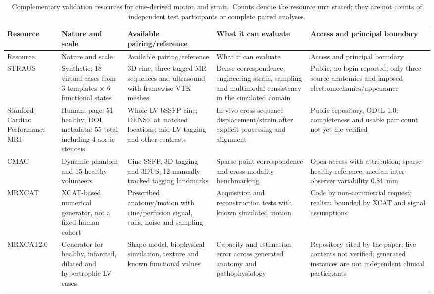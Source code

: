 \Needspace{100mm}
{\scriptsize\sloppy
\setlength{\tabcolsep}{2pt}
\begin{longtable}{L{0.12\textwidth}L{0.14\textwidth}L{0.18\textwidth}L{0.16\textwidth}L{0.20\textwidth}}
\caption{Complementary validation resources for cine-derived motion and strain. Counts denote the resource unit stated; they are not counts of independent test participants or complete paired analyses.}\label{tab:resources}\\
\toprule
Resource & Nature and scale & Available pairing/reference & What it can evaluate & Access and principal boundary \\
\midrule
\endfirsthead
\toprule
Resource & Nature and scale & Available pairing/reference & What it can evaluate & Access and principal boundary \\
\midrule
\endhead
STRAUS~\cite{zhou2018straus,strausdata} & Synthetic; 18 virtual cases from 3 templates $\times$ 6 functional states & 3D cine, three tagged MR sequences and ultrasound with framewise VTK meshes & Dense correspondence, engineering strain, sampling and multimodal consistency in the simulated domain & Public, no login reported; only three source anatomies and imposed electromechanics/appearance \\
\addlinespace
Stanford Cardiac Performance MRI~\cite{stanforddata} & Human; page: 51 healthy; DOI metadata: 55 total including 4 aortic stenosis & Whole-LV bSSFP cine; DENSE at matched locations; mid-LV tagging and other contrasts & In-vivo cross-sequence displacement/strain after explicit processing and alignment & Public repository, ODbL 1.0; completeness and usable pair count not yet file-verified \\
\addlinespace
CMAC~\cite{tobongomez2013cmac,cmac2011} & Dynamic phantom and 15 healthy volunteers & Cine SSFP, 3D tagging and 3DUS; 12 manually tracked tagging landmarks & Sparse point correspondence and cross-modality benchmarking & Open access with attribution; sparse healthy reference, median inter-observer variability 0.84~mm \\
\addlinespace
MRXCAT~\cite{wissmann2014mrxcat} & XCAT-based numerical generator, not a fixed human cohort & Prescribed anatomy/motion with cine/perfusion signal, coils, noise and sampling & Acquisition and reconstruction tests with known simulated motion & Code by non-commercial request; realism bounded by XCAT and signal assumptions \\
\addlinespace
MRXCAT2.0\newline\cite{mrxcat2023,mrxcat2repo} & Generator for healthy, infarcted, dilated and hypertrophic LV cases & Shape model, biophysical simulation, texture and known functional values & Capacity and estimation error across generated anatomy and patho\-physiology & Repository cited by the paper; live contents not verified; generated instances are not independent clinical participants \\

\end{longtable}}
